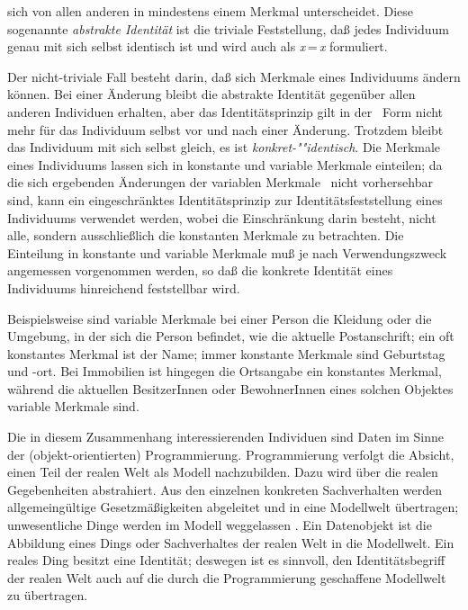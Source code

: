 sich von allen anderen in mindestens einem Merkmal
unterscheidet. Diese sogenannte {\em abstrakte Identit\"{a}t\/} ist die
triviale Feststellung, da\ss{} jedes Individuum genau mit sich selbst
identisch ist und wird auch als {\it x}\,=\,{\it x} formuliert.
%
\par{}Der nicht-triviale Fall besteht darin, da\ss{} sich Merkmale
eines Individuums \"{a}ndern k\"{o}nnen. Bei einer \"{A}nderung bleibt die
abstrakte Identit\"{a}t gegen\"{u}ber allen anderen Individuen erhalten,
aber das Identit\"{a}tsprinzip gilt in der \og[en]\ Form nicht mehr f\"{u}r
das Individuum selbst vor und nach einer \"{A}nderung.  Trotzdem bleibt
das Individuum mit sich selbst gleich, es ist {\em
kon\-kret-""iden\-tisch}. Die Merkmale eines Individuums lassen sich
in konstante und variable Merkmale einteilen; da die sich ergebenden
\"{A}nderungen der variablen Merkmale \ia\ nicht vorhersehbar sind, kann
ein eingeschr\"{a}nktes Identit\"{a}tsprinzip zur Identit\"{a}tsfeststellung
eines Individuums verwendet werden, wobei die Einschr\"{a}nkung darin
besteht, nicht alle, sondern ausschlie\ss{}lich die konstanten Merkmale
zu betrachten. Die Einteilung in konstante und variable Merkmale mu\ss{}
je nach Verwendungszweck angemessen vorgenommen werden, so da\ss{} die
konkrete Identit\"{a}t eines Individuums hinreichend feststellbar wird.
%
\par{}Beispielsweise sind variable Merkmale bei einer Person die
Kleidung oder die Umgebung, in der sich die Person befindet, wie die
aktuelle Postanschrift; ein oft konstantes Merkmal ist der Name; immer
konstante Merkmale sind Geburtstag und -ort. Bei Immobilien ist
hingegen die Ortsangabe ein konstantes Merkmal, w\"{a}hrend die aktuellen
BesitzerInnen oder BewohnerInnen eines solchen Objektes variable
Merkmale sind.
%
\par{}Die in diesem Zusammenhang interessierenden Individuen sind
Daten im Sinne der (objekt-orientierten) Programmierung.
Programmierung verfolgt die Absicht, einen Teil der realen Welt als
Modell nachzubilden. Dazu wird \"{u}ber die realen Gegebenheiten
abstrahiert. Aus den einzelnen konkreten Sachverhalten werden
allgemeing\"{u}ltige Gesetzm\"{a}\ss{}igkeiten abgeleitet und in eine
Modellwelt \"{u}bertragen; unwesentliche Dinge werden im Modell
weggelassen \cite[]{bib:wa89}. Ein Datenobjekt
ist die Abbildung eines Dings oder Sachverhaltes der realen Welt in
die Modellwelt. Ein reales Ding besitzt eine Identit\"{a}t; deswegen ist
es sinnvoll, den Identit\"{a}tsbegriff der realen Welt auch auf die durch
die Programmierung geschaffene Modellwelt zu \"{u}ber\-tra\-gen.
%
